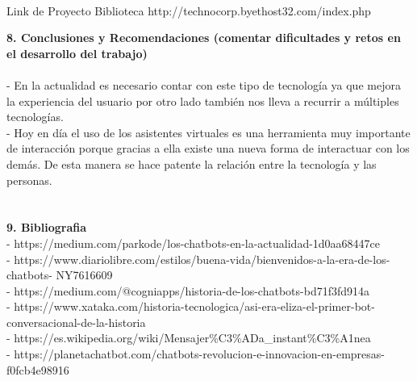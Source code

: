\begin{flushleft}
\begin{itemize}
\textbf{ }\\
Link de Proyecto Biblioteca
http://technocorp.byethost32.com/index.php

\textbf{8.  Conclusiones y Recomendaciones (comentar dificultades y retos en el desarrollo del trabajo)}\\
\textbf{ }\\
-	En la actualidad es necesario contar con este tipo de tecnología ya que mejora la experiencia del usuario por otro lado también nos lleva a recurrir a múltiples tecnologías.\textbf{ }\\
-	Hoy en día el uso de los asistentes virtuales es una herramienta muy importante de interacción porque gracias a ella existe una nueva forma de interactuar con los demás. De esta manera se hace patente la relación entre la tecnología y las personas.\textbf{ }\\
\textbf{ }\\
\textbf{ }\\
\textbf{9. Bibliografia}\\

- https://medium.com/parkode/los-chatbots-en-la-actualidad-1d0aa68447ce\\
- https://www.diariolibre.com/estilos/buena-vida/bienvenidos-a-la-era-de-los-chatbots- NY7616609\\
- https://medium.com/@cogniapps/historia-de-los-chatbots-bd71f3fd914a\\
- https://www.xataka.com/historia-tecnologica/asi-era-eliza-el-primer-bot- conversacional-de-la-historia\\
- https://es.wikipedia.org/wiki/Mensajer\%C3\%ADa\_instant\%C3\%A1nea\\
- https://planetachatbot.com/chatbots-revolucion-e-innovacion-en-empresas- f0fcb4e98916\\

\end{itemize} 


\end{flushleft}